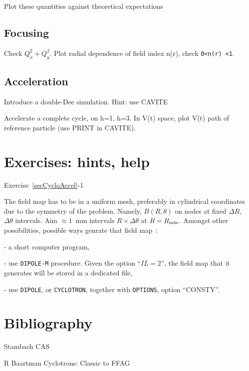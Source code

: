 Plot these quantities against theoretical expectations


\subsection{Focusing}

Check $Q_x^2 +Q_y^2$. Plot radial dependence of field index n(r), check \verb|0<n(r) <1|.


\subsection{Acceleration}

Introduce a double-Dee simulation. Hint: use CAVITE

Accelerate a complete cycle, on h=1, h=3. In V(t) space, plot V(t) path of reference particle (use PRINT in CAVITE). 






\section{Exercises: hints, help}

\noindent {\small $\bullet$} Exercise~\ref{secCycloAccel}-1 

The field map has to be in a uniform mesh, preferably in cylindrical coordinates due to the symmetry of the problem.
Namely, $B(R,\theta)$ on nodes at fixed $\Delta R$, $\Delta \theta$ intervals. Aim $\approx 1$~mm intervals 
$R\times \Delta \theta$ at $R=R_{\rm min}$. Amongst other possibilities, possible ways genrate that field map~: 

- a short computer program,

- use \texttt{DIPOLE-M} procedure. Given the option ``$IL=2$'', the field map that it generates will be stored in a dedicated file,

- use \texttt{DIPOLE}, or \texttt{CYCLOTRON}, together with \texttt{OPTIONS}, option ``CONSTY''.






\section{Bibliography \label{SecBiblioCyclotron}}

Stambach CAS

R Baartman Cyclotrons: Classic to FFAG

